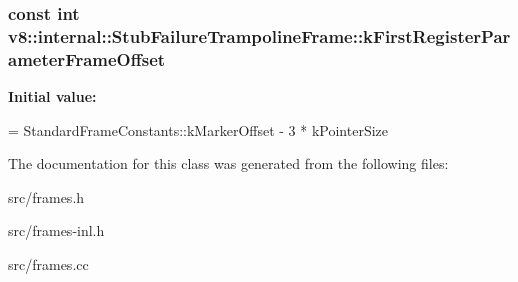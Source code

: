 \subsubsection[{k\+First\+Register\+Parameter\+Frame\+Offset}]{\setlength{\rightskip}{0pt plus 5cm}const int v8\+::internal\+::\+Stub\+Failure\+Trampoline\+Frame\+::k\+First\+Register\+Parameter\+Frame\+Offset\hspace{0.3cm}{\ttfamily [static]}}\label{classv8_1_1internal_1_1_stub_failure_trampoline_frame_a720c3702483b59a9f3bedb5ceca05d2e}
{\bfseries Initial value\+:}
\begin{DoxyCode}
=
      StandardFrameConstants::kMarkerOffset - 3 * kPointerSize
\end{DoxyCode}


The documentation for this class was generated from the following files\+:\begin{DoxyCompactItemize}
\item 
src/frames.\+h\item 
src/frames-\/inl.\+h\item 
src/frames.\+cc\end{DoxyCompactItemize}
